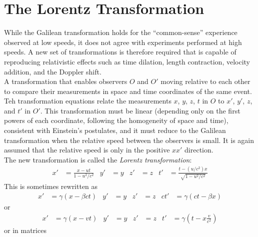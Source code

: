 \documentclass{subfiles}
\begin{document}
	\section{The Lorentz Transformation}
		While the Galilean transformation holds for the \enquote{common-sense} experience observed at low speeds, it does not agree with experiments performed at high speeds. A new set of transformations is therefore required that is capable of reproducing relativistic effects such as time dilation, length contraction, velocity addition, and the Doppler shift. \\
		A transformation that enables observers \(O\) and \(O'\) moving relative to each other to compare their measurements in space and time coordinates of the same event. Teh transformation equations relate the measurements \(x\), \(y\), \(z\), \(t\) in \(O\) to \(x'\), \(y'\), \(z\), and \(t'\) in \(O'\). This transformation must be linear (depending only on the first powers of each coordinate, following the homogeneity of space and time), consistent with Einstein's postulates, and it must reduce to the Galilean transformation when the relative speed between the observers is small. It is again assumed that the relative speed is only in the positive \(xx'\) direction. \\
		The new transformation is called the \textit{Lorentz transformation}:
		\begin{align*}
			x' &= \frac{x - ut}{1 - u^2/c^2} &
				y' &= y &
				z' &= z &
				t' &= \frac{t - (u/c^2)x}{\sqrt{1 - u^2/c^2}}
					\tag{Lorentz transformation}
		\end{align*}
		This is sometimes rewritten as
		\begin{align*}
			x' &= \gamma(x - \beta ct) &
				y' &= y &
				z' &= z &
				ct' &= \gamma(ct - \beta x)	
		\end{align*}
		or
		\begin{align*}
			x' &= \gamma(x - vt) &
				y' &= y &
				z' &= z &
				t' &= \gamma\left(t - x\frac{v}{c^2}\right)	
		\end{align*}
		or in matrices
\end{document}
